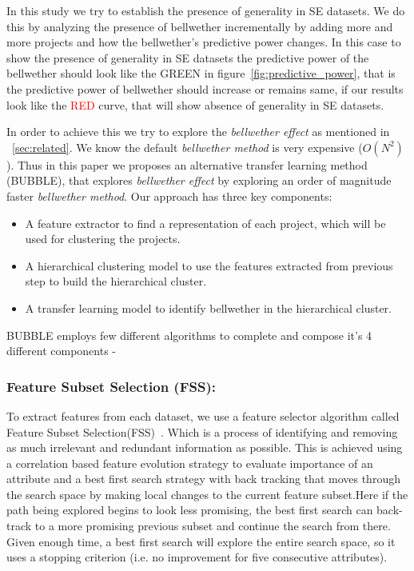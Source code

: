 \documentclass[10pt,journal,compsoc]{IEEEtran}
\newcommand{\bi}{\begin{itemize}}
\newcommand{\ei}{\end{itemize}}
\begin{document}
In this study we try to establish the presence of generality in SE datasets. We do this by analyzing the presence of bellwether incrementally by adding more and more projects and how the bellwether's predictive power changes. In this case to show the presence of generality in SE datasets the predictive power of the bellwether should look like the \textcolor{ao(english)}{GREEN} in figure~\ref{fig:predictive_power}, that is the predictive power of bellwether should increase or remains same, if our results look like the \textcolor{red}{RED} curve, that will show absence of generality in SE datasets.

In order to achieve this we try to explore the \textit{bellwether effect} as mentioned in ~\ref{sec:related}. We know the default \textit{bellwether method} is very expensive ($ O(N^2) $). Thus in this paper we proposes an alternative transfer learning method (BUBBLE), that explores \textit{bellwether effect} by exploring an order of magnitude faster \textit{bellwether method}. Our approach has three key components:

\bi

    \item A feature extractor to find a representation of each project, which will be used for clustering the projects. 
    
    \item A hierarchical clustering model to use the features extracted from previous step to build the hierarchical cluster.
    
    \item A transfer learning model to identify bellwether in the hierarchical cluster.

\ei

BUBBLE employs few different algorithms to complete and compose it's 4 different components - 

\subsubsection{\textbf{Feature Subset Selection (FSS):}}
\label{subsec:FSS}
To extract features from each dataset, we use a feature selector algorithm called Feature Subset Selection(FSS)~\cite{hall1999correlation,hall1997feature}. Which is a process of identifying and removing as much irrelevant and redundant information as possible. This is achieved using a correlation based feature evolution strategy to evaluate importance of an attribute and a best first search strategy with back tracking that moves through the search space by making local changes to the current feature subset.Here if the path being explored begins to look less promising, the best first search can back-track to a more promising previous subset and continue the search from there. Given enough time, a best first search will explore the entire search space, so it uses a stopping criterion (i.e. no improvement for five consecutive attributes).
\end{document}
